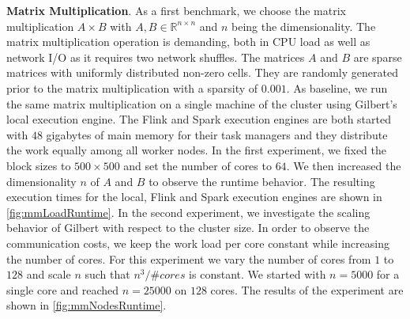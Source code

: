 \textbf{Matrix Multiplication}. 
As a first benchmark, we choose the matrix multiplication $A\times B$ with $A,B \in \mathbb{R}^{n\times n}$ and $n$ being the dimensionality. 
The matrix multiplication operation is demanding, both in CPU load as well as network I/O as it requires two network shuffles. 
The matrices $A$ and $B$ are sparse matrices with uniformly distributed non-zero cells. 
They are randomly generated prior to the matrix multiplication with a sparsity of $0.001$. 
As baseline, we run the same matrix multiplication on a single machine of the cluster using Gilbert's local execution engine. 
The Flink and Spark execution engines are both started with $48$ gigabytes of main memory for their task managers and they distribute the work equally among all worker nodes. 
In the first experiment, we fixed the block sizes to $500 \times 500$ and set the number of cores to $64$. 
We then increased the dimensionality $n$ of $A$ and $B$ to observe the runtime behavior. 
The resulting execution times for the local, Flink and Spark execution engines are shown in \cref{fig:mmLoadRuntime}. 
In the second experiment, we investigate the scaling behavior of Gilbert with respect to the cluster size. 
In order to observe the communication costs, we keep the work load per core constant while increasing the number of cores. 
For this experiment we vary the number of cores from $1$ to $128$ and scale $n$ such that $n^3/\#cores$ is constant. 
We started with $n=5000$ for a single core and reached $n=25000$ on $128$ cores. 
The results of the experiment are shown in \cref{fig:mmNodesRuntime}.
